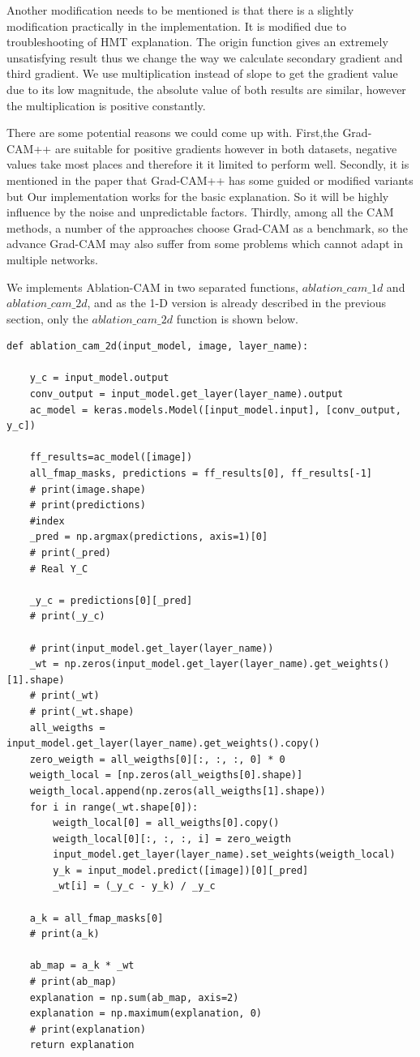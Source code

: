 \documentclass[conference]{IEEEtran}
\begin{document}
Another modification needs to be mentioned is that there is a slightly modification practically in the implementation. It is modified due to troubleshooting of HMT explanation. The origin function gives an extremely unsatisfying result thus we change the way we calculate secondary gradient and third gradient. We use multiplication instead of slope to get the gradient value due to its low magnitude, the absolute value of both results are similar, however the multiplication is positive constantly.\par
There are some potential reasons we could come up with. First,the Grad-CAM++ are suitable for positive gradients however in both datasets, negative values take most places and therefore it it limited to perform well. Secondly, it is mentioned in the paper that Grad-CAM++ has some guided or modified variants but Our implementation works for the basic explanation. So it will be highly influence by the noise and unpredictable factors. Thirdly, among all the CAM methods, a number of the approaches choose Grad-CAM as a benchmark, so the advance Grad-CAM may also suffer from some problems which cannot adapt in multiple networks.\par

We implements Ablation-CAM in two separated functions, $ablation\_cam\_1d$ and $ablation\_cam\_2d$, and  as the 1-D version is already described in the previous section, only the $ablation\_cam\_2d$ function is shown below.

\begin{lstlisting}
def ablation_cam_2d(input_model, image, layer_name):

    y_c = input_model.output
    conv_output = input_model.get_layer(layer_name).output
    ac_model = keras.models.Model([input_model.input], [conv_output, y_c])

    ff_results=ac_model([image])
    all_fmap_masks, predictions = ff_results[0], ff_results[-1]
    # print(image.shape)
    # print(predictions)
    #index
    _pred = np.argmax(predictions, axis=1)[0]
    # print(_pred)
    # Real Y_C

    _y_c = predictions[0][_pred]
    # print(_y_c)

    # print(input_model.get_layer(layer_name))
    _wt = np.zeros(input_model.get_layer(layer_name).get_weights()[1].shape)
    # print(_wt)
    # print(_wt.shape)
    all_weigths = input_model.get_layer(layer_name).get_weights().copy()
    zero_weigth = all_weigths[0][:, :, :, 0] * 0
    weigth_local = [np.zeros(all_weigths[0].shape)]
    weigth_local.append(np.zeros(all_weigths[1].shape))
    for i in range(_wt.shape[0]):
        weigth_local[0] = all_weigths[0].copy()
        weigth_local[0][:, :, :, i] = zero_weigth
        input_model.get_layer(layer_name).set_weights(weigth_local)
        y_k = input_model.predict([image])[0][_pred]
        _wt[i] = (_y_c - y_k) / _y_c

    a_k = all_fmap_masks[0]
    # print(a_k)

    ab_map = a_k * _wt
    # print(ab_map)
    explanation = np.sum(ab_map, axis=2)
    explanation = np.maximum(explanation, 0)
    # print(explanation)
    return explanation
\end{lstlisting}
\end{document}
